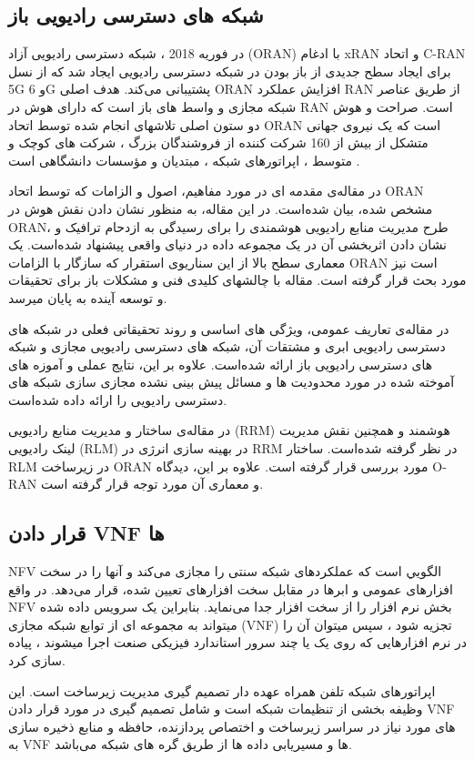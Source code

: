 \subsection{ شبکه های دسترسی رادیویی باز}
در فوریه 2018 ، شبکه دسترسی رادیویی آزاد (ORAN) با ادغام  xRAN و اتحاد C-RAN برای ایجاد سطح جدیدی از باز بودن در شبکه دسترسی رادیویی ایجاد شد که از نسل 5G و 6G پشتیبانی می‌کند.
هدف اصلی ORAN افزایش عملکرد RAN از طریق عناصر شبکه مجازی و واسط های باز است که دارای هوش در RAN است.
صراحت و هوش دو ستون اصلی تلاشهای انجام شده توسط اتحاد ORAN است که یک نیروی جهانی متشکل از بیش از 160 شرکت کننده از فروشندگان بزرگ ، شرکت های کوچک و متوسط ، اپراتورهای شبکه ، مبتدیان و مؤسسات دانشگاهی است
\cite{oranpaper}
.

در مقاله‌ی 
\cite{oranInt}
 مقدمه ای در مورد مفاهیم، اصول و الزامات  که توسط اتحاد ORAN مشخص شده، بیان شده‌است.
 در این مقاله،
 به منظور نشان دادن نقش هوش در ORAN، طرح مدیریت منابع رادیویی هوشمندی را برای رسیدگی به ازدحام ترافیک و نشان دادن اثربخشی آن در یک مجموعه داده در دنیای واقعی پیشنهاد شده‌است.
 یک معماری سطح بالا از این سناریوی استقرار که سازگار با الزامات ORAN است نیز مورد بحث قرار گرفته است. مقاله با چالشهای کلیدی فنی و مشکلات باز برای تحقیقات و توسعه آینده به پایان میرسد.
 
در مقاله‌ی
\cite{c2o}
تعاریف عمومی، ویژگی های اساسی و روند تحقیقاتی فعلی در شبکه های دسترسی رادیویی ابری و مشتقات آن، شبکه های دسترسی رادیویی مجازی و شبکه های دسترسی رادیویی باز ارائه شده‌است.
علاوه بر این، نتایج عملی و آموزه های آموخته شده در مورد محدودیت ها و مسائل پیش بینی نشده مجازی سازی شبکه های دسترسی رادیویی را ارائه داده شده‌است.

در مقاله‌ی 
\cite{sree2019open, kawahara2019ran}
 ساختار و مدیریت منابع رادیویی (RRM) هوشمند 
 و همچنین نقش مدیریت لینک رادیویی (RLM) در بهینه سازی انرژی در RRM
در نظر گرفته شده‌است.
ساختار RLM در 
زیرساخت ORAN مورد بررسی قرار گرفته است.
علاوه بر این، دیدگاه
O-RAN
 و معماری آن مورد توجه قرار گرفته است.
\subsection{قرار دادن VNF ها}
NFV
 الگویي است که عملکردهای شبکه سنتی را مجازی می‌کند و آنها را در سخت افزارهای عمومی و ابرها در مقابل سخت افزارهای تعیین شده، قرار می‌دهد.
 در واقع NFV بخش نرم افزار را از سخت افزار جدا می‌نماید.
 بنابراین یک سرویس داده شده میتواند به مجموعه ای از توابع شبکه مجازی (VNF) تجزیه شود ، سپس میتوان آن را در نرم افزارهایی که روی یک یا چند سرور استاندارد فیزیکی صنعت اجرا میشوند ، پیاده سازی کرد.
 
اپراتورهای شبکه تلفن همراه عهده دار تصمیم گیری مدیریت زیرساخت است.
این وظیفه بخشی از تنظیمات شبکه است و شامل تصمیم گیری در مورد قرار دادن VNF های مورد نیاز در سراسر زیرساخت و اختصاص پردازنده، حافظه و منابع ذخیره سازی به VNF ها و مسیریابی داده ها از طریق گره های شبکه
می‌باشد.

